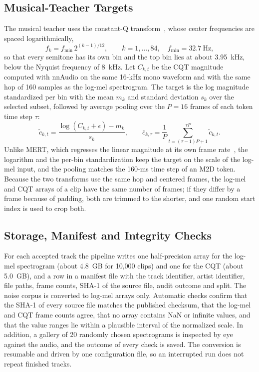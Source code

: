 \documentclass{FastFyp}
\begin{document}
\subsection{Musical-Teacher Targets}
The musical teacher uses the constant-Q transform~\cite{ref:Brown:1991cqt}, whose center frequencies are spaced logarithmically,
\begin{equation}
f_k=f_{\min}\,2^{(k-1)/12},\qquad k=1,\dots,84,\quad f_{\min}=32.7~\mathrm{Hz},
\label{eq:m5-cqtfreq}
\end{equation}
so that every semitone has its own bin and the top bin lies at about 3.95~kHz, below the Nyquist frequency of 8~kHz. Let $C_{k,t}$ be the CQT magnitude computed with nnAudio on the same 16-kHz mono waveform and with the same hop of 160 samples as the log-mel spectrogram. The target is the log magnitude standardized per bin with the mean $m_k$ and standard deviation $s_k$ over the selected subset, followed by average pooling over the $P=16$ frames of each token time step $\tau$:
\begin{equation}
\tilde{c}_{k,t}=\frac{\log(C_{k,t}+\epsilon)-m_k}{s_k},\qquad
\bar{c}_{k,\tau}=\frac{1}{P}\sum_{t=(\tau-1)P+1}^{\tau P}\tilde{c}_{k,t}.
\label{eq:m5-cqttarget}
\end{equation}
Unlike MERT, which regresses the linear magnitude at its own frame rate~\cite{ref:MERTGit}, the logarithm and the per-bin standardization keep the target on the scale of the log-mel input, and the pooling matches the 160-ms time step of an M2D token. Because the two transforms use the same hop and centered frames, the log-mel and CQT arrays of a clip have the same number of frames; if they differ by a frame because of padding, both are trimmed to the shorter, and one random start index is used to crop both.

\subsection{Storage, Manifest and Integrity Checks}
For each accepted track the pipeline writes one half-precision array for the log-mel spectrogram (about 4.8~GB for 10,000 clips) and one for the CQT (about 5.0~GB), and a row in a manifest file with the track identifier, artist identifier, file paths, frame counts, SHA-1 of the source file, audit outcome and split. The noise corpus is converted to log-mel arrays only. Automatic checks confirm that the SHA-1 of every source file matches the published checksum, that the log-mel and CQT frame counts agree, that no array contains NaN or infinite values, and that the value ranges lie within a plausible interval of the normalized scale. In addition, a gallery of 20 randomly chosen spectrograms is inspected by eye against the audio, and the outcome of every check is saved. The conversion is resumable and driven by one configuration file, so an interrupted run does not repeat finished tracks.
\end{document}
